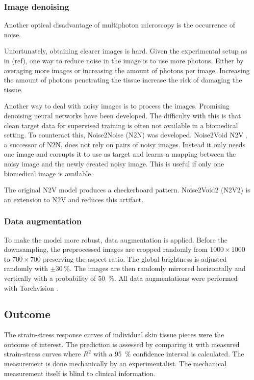 \subsubsection{Image denoising}
Another optical disadvantage of multiphoton microscopy is the occurrence of noise.

Unfortunately, obtaining clearer images is hard.
Given the experimental setup as in (ref), one way to reduce noise in the image is to use more photons.
Either by averaging more images or increasing the amount of photons per image.
Increasing the amount of photons penetrating the tissue increase the risk of damaging the tissue.

Another way to deal with noisy images is to process the images.
Promising denoising neural networks have been developed.
The difficulty with this is that clean target data for supervised training is often not available in a biomedical setting.
To counteract this, Noise2Noise (N2N) \cite{Lehtinen2018} was developed.
Noise2Void N2V \cite{Krull2019}, a successor of N2N, does not rely on pairs of noisy images.
Instead it only needs one image and corrupts it to use as target and learns a mapping between the noisy image and the newly created noisy image.
This is useful if only one biomedical image is available.

The original N2V model produces a checkerboard pattern.
Noise2Void2 (N2V2) \cite{Hock2022} is an extension to N2V and reduces this artifact.

\subsubsection{Data augmentation}

To make the model more robust, data augmentation is applied.
Before the downsampling, the preprocessed images are cropped randomly from $1000\times1000$ to $700\times700$ preserving the aspect ratio.
The global brightness is adjusted randomly with $\pm \qty{30}{\percent}$.
The images are then randomly mirrored horizontally and vertically with a probability of \qty{50}{\percent}.
All data augmentations were performed with Torchvision \cite{torchvision2016}.

\subsection{Outcome}
The strain-stress response curves of individual skin tissue pieces were the outcome of interest.
The prediction is assessed by comparing it with measured strain-stress curves where $R^2$ with a \qty{95}{\percent} confidence interval is calculated.
The measurement is done mechanically by an experimentalist.
The mechanical measurement itself is blind to clinical information.

